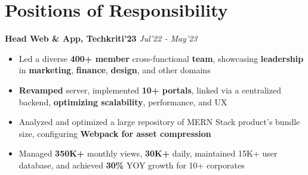 \section*{\sc Positions of Responsibility}
\vspace{-2mm}
\hrulefill
\vspace{1mm}

\textbf{Head Web \& App, Techkriti'23}
\hspace{2cm}
\emph{Jul'22 - May'23}
{
  \begin{itemize}
    \item  Led a diverse \textbf{400+ member} cross-functional \textbf{team}, showcasing \textbf{leadership} in \textbf{marketing}, \textbf{finance}, \textbf{design}, and other domains
    \item \textbf{Revamped} server, implemented \textbf{10+ portals}, linked via a centralized backend, \textbf{optimizing scalability}, performance, and UX
    \item Analyzed
and optimized a large repository of MERN Stack product’s bundle size, configuring \textbf{Webpack for asset compression}
    \item 
Managed \textbf{350K+} monthly views, \textbf{30K+} daily, maintained 15K+ user database, and achieved \textbf{30\%} YOY growth for 10+ corporates
  \end{itemize}
}

